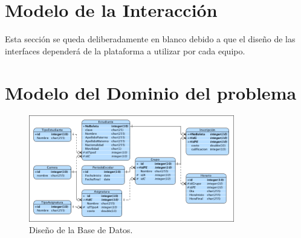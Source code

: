\documentclass[oneside,10pt]{book}
\begin{document}
\chapter{Modelo de la Interacción}

{\color{UCInterfaceColor} 
	Esta sección se queda deliberadamente en blanco debido a que el diseño de las interfaces dependerá de la plataforma a utilizar por cada equipo.\\	
}



\chapter{Modelo del Dominio del problema}

	\begin{figure}[htbp!]
		\centering
			\includegraphics[width=0.8\textwidth]{images/baseDeDatos}
		\caption{Diseño de la Base de Datos.}
	\end{figure}
	

\end{document}
